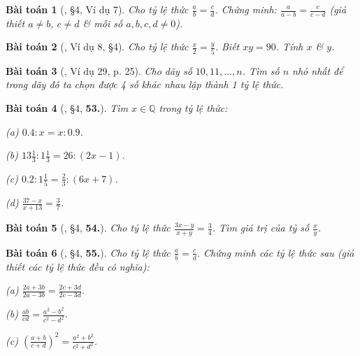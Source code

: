 \documentclass{article}
\numberwithin{equation}{section}
\newtheorem{baitoan}{Bài toán}
\begin{document}
\begin{baitoan}[\cite{Binh_Toan_7_tap_1}, \S4, Ví dụ 7]
	Cho tỷ lệ thức $\frac{a}{b} = \frac{c}{d}$. Chứng minh: $\frac{a}{a - b} = \frac{c}{c - d}$ (giả thiết $a\ne b$, $c\ne d$ \& mỗi số $a,b,c,d\ne 0$).
\end{baitoan}

\begin{baitoan}[\cite{Binh_Toan_7_tap_1}, Ví dụ 8, \S4]
	Cho tỷ lệ thức $\frac{x}{2} = \frac{y}{5}$. Biết $xy = 90$. Tính $x$ \& $y$.
\end{baitoan}

\begin{baitoan}[\cite{Binh_Toan_7_tap_1}, Ví dụ 29, p. 25]
	Cho dãy số $10,11,\ldots,n$. Tìm số $n$ nhỏ nhất để trong dãy đó ta chọn được 4 số khác nhau lập thành 1 tỷ lệ thức.
\end{baitoan}

\begin{baitoan}[\cite{Binh_Toan_7_tap_1}, \S4, \textbf{53.}]
	Tìm $x\in\mathbb{Q}$ trong tỷ lệ thức:
	\begin{enumerate*}
		\item[(a)] $0.4:x = x:0.9$.
		\item[(b)] $13\frac{1}{3}:1\frac{1}{3} = 26:(2x - 1)$.
		\item[(c)] $0.2:1\frac{1}{5} = \frac{2}{3}:(6x + 7)$.
		\item[(d)] $\frac{37 - x}{x + 13} = \frac{3}{7}$.
	\end{enumerate*}
\end{baitoan}

\begin{baitoan}[\cite{Binh_Toan_7_tap_1}, \S4, \textbf{54.}]
	Cho tỷ lệ thức $\frac{3x - y}{x + y} = \frac{3}{4}$. Tìm giá trị của tỷ số $\frac{x}{y}$.
\end{baitoan}

\begin{baitoan}[\cite{Binh_Toan_7_tap_1}, \S4, \textbf{55.}]
	Cho tỷ lệ thức $\frac{a}{b} = \frac{c}{d}$. Chứng minh các tỷ lệ thức sau (giả thiết các tỷ lệ thức đều có nghĩa):
	\begin{enumerate*}
		\item[(a)] $\frac{2a + 3b}{2a - 3b} = \frac{2c + 3d}{2c - 3d}$.
		\item[(b)] $\frac{ab}{cd} = \frac{a^2 - b^2}{c^2 - d^2}$.
		\item[(c)] $\left(\frac{a + b}{c + d}\right)^2 = \frac{a^2 + b^2}{c^2 + d^2}$.
	\end{enumerate*}
\end{baitoan}
\end{document}
